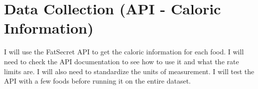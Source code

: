 \section{Data Collection (API - Caloric Information)}

I will use the FatSecret API to get the caloric information for each food. I will need to check the API documentation to see how to use it and what the rate limits are. I will also need to standardize the units of measurement. I will test the API with a few foods before running it on the entire dataset.

